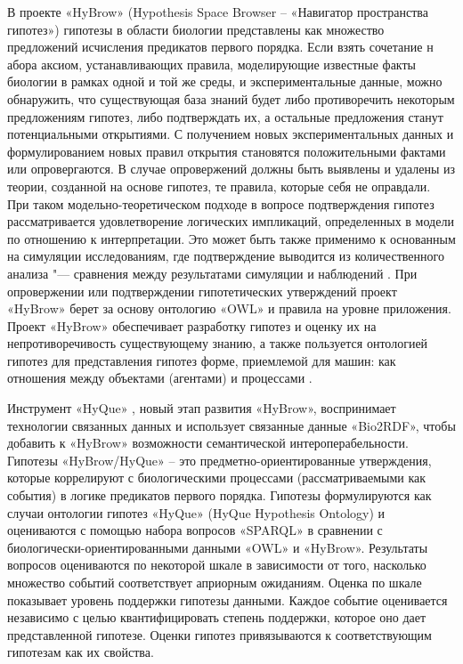 В проекте «HyBrow» (Hypothesis Space Browser – «Навигатор пространства гипотез») \cite{racunas2004hybrow} гипотезы 
в области биологии представлены как множество предложений исчисления предикатов первого порядка. Если взять сочетание н
абора аксиом, устанавливающих правила, моделирующие известные факты биологии в рамках одной и той же среды, и 
экспериментальные данные, можно обнаружить, что существующая база знаний будет либо противоречить некоторым 
предложениям гипотез, либо подтверждать их, а остальные предложения станут потенциальными открытиями. С получением 
новых экспериментальных данных и формулированием новых правил открытия становятся положительными фактами или 
опровергаются. В случае опровержений должны быть выявлены и удалены из теории, созданной на основе гипотез, те 
правила, которые себя не оправдали. При таком модельно-теоретическом подходе в вопросе подтверждения гипотез 
рассматривается удовлетворение логических импликаций, определенных в модели по отношению к интерпретации. Это может 
быть также применимо к основанным на симуляции исследованиям, где подтверждение выводится из количественного 
анализа "--- сравнения между результатами симуляции и наблюдений \cite{porto2013}. При опровержении или подтверждении 
гипотетических утверждений проект «HyBrow» берет за основу онтологию «OWL» и правила на уровне приложения. 
Проект «HyBrow» обеспечивает разработку гипотез и оценку их на непротиворечивость существующему знанию, а также 
пользуется онтологией гипотез для представления гипотез форме, приемлемой для машин: как отношения между объектами 
(агентами) и процессами \cite{soldatova2011representation}.

Инструмент «HyQue» \cite{callahan2011hyque}, новый этап развития «HyBrow», воспринимает технологии связанных данных 
и использует связанные данные «Bio2RDF», чтобы добавить к «HyBrow» возможности семантической интероперабельности. 
Гипотезы «HyBrow/HyQue» – это предметно-ориентированные утверждения, которые коррелируют с биологическими процессами 
(рассматриваемыми как события) в логике предикатов первого порядка. Гипотезы формулируются как случаи онтологии 
гипотез «HyQue» (HyQue Hypothesis Ontology) и оцениваются с помощью набора вопросов «SPARQL» в сравнении с 
биологически-ориентированными данными «OWL» и «HyBrow». Результаты вопросов оцениваются по некоторой шкале в 
зависимости от того, насколько множество событий соответствует априорным ожиданиям. Оценка по шкале показывает 
уровень поддержки гипотезы данными. Каждое событие оценивается независимо с целью квантифицировать степень поддержки, 
которое оно дает представленной гипотезе. Оценки гипотез привязываются к соответствующим гипотезам как их свойства.

